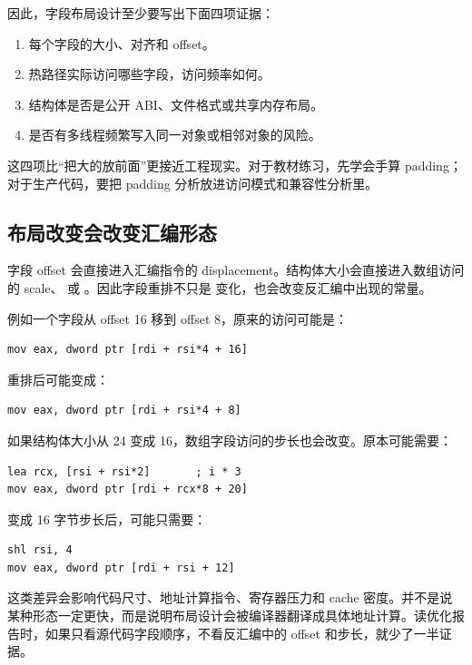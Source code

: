 因此，字段布局设计至少要写出下面四项证据：

\begin{enumerate}
  \item 每个字段的大小、对齐和 offset。
  \item 热路径实际访问哪些字段，访问频率如何。
  \item 结构体是否是公开 ABI、文件格式或共享内存布局。
  \item 是否有多线程频繁写入同一对象或相邻对象的风险。
\end{enumerate}

这四项比“把大的放前面”更接近工程现实。对于教材练习，先学会手算 padding；对于生产代码，要把 padding 分析放进访问模式和兼容性分析里。

\subsection{布局改变会改变汇编形态}

字段 offset 会直接进入汇编指令的 displacement。结构体大小会直接进入数组访问的 scale、 或 。因此字段重排不只是  变化，也会改变反汇编中出现的常量。

例如一个字段从 offset 16 移到 offset 8，原来的访问可能是：

\begin{lstlisting}
mov eax, dword ptr [rdi + rsi*4 + 16]
\end{lstlisting}

重排后可能变成：

\begin{lstlisting}
mov eax, dword ptr [rdi + rsi*4 + 8]
\end{lstlisting}

如果结构体大小从 24 变成 16，数组字段访问的步长也会改变。原本可能需要：

\begin{lstlisting}
lea rcx, [rsi + rsi*2]       ; i * 3
mov eax, dword ptr [rdi + rcx*8 + 20]
\end{lstlisting}

变成 16 字节步长后，可能只需要：

\begin{lstlisting}
shl rsi, 4
mov eax, dword ptr [rdi + rsi + 12]
\end{lstlisting}

这类差异会影响代码尺寸、地址计算指令、寄存器压力和 cache 密度。并不是说某种形态一定更快，而是说明布局设计会被编译器翻译成具体地址计算。读优化报告时，如果只看源代码字段顺序，不看反汇编中的 offset 和步长，就少了一半证据。

